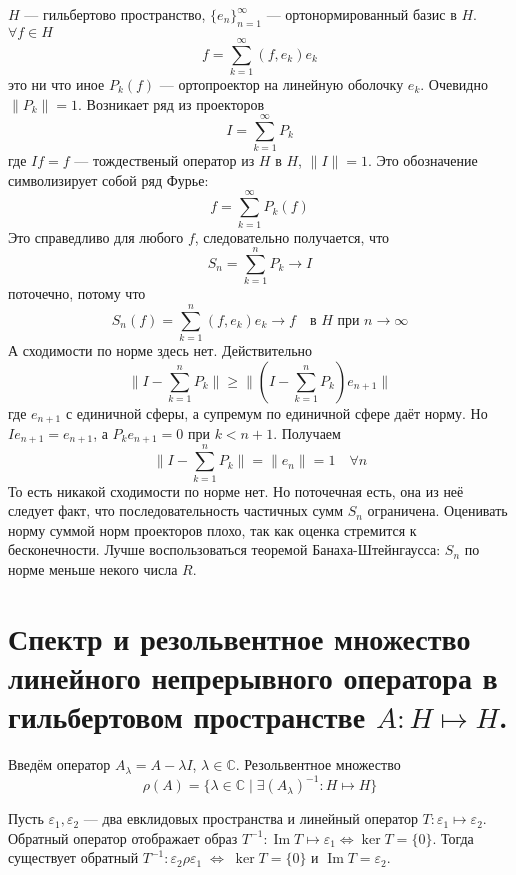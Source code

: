 \documentclass[12pt]{article}
\renewcommand{\Im}{\operatorname{Im}}
\begin{document}
\begin{Prim}
    $H$ --- гильбертово пространство, $\{e_n\}_{n = 1}^{\infty}$ --- ортонормированный базис в $H$.
    $\forall f \in H$
    $$
     f = \sum\limits_{k = 1}^{\infty}(f, e_k)e_k
    $$ 
    это ни что иное $P_k(f)$ --- ортопроектор на линейную оболочку $e_k$.
    Очевидно $\|P_k\| = 1$.
    Возникает ряд из проекторов 
    $$
    I = \sum\limits_{k = 1}^{\infty}P_k
    $$
    где $If = f$ --- тождественый оператор из $H$ в $H$, $\|I\| = 1$.
    Это обозначение символизирует собой ряд Фурье:
    $$
    f = \sum\limits_{k = 1}^{\infty}P_k(f)
    $$
    Это справедливо для любого $f$, следовательно получается, что 
    $$
    S_n = \sum\limits_{k = 1}^{n}P_k \to I
    $$ поточечно, потому что
    $$
    S_n(f) = \sum\limits_{k = 1}^{n}(f, e_k)e_k \to f \quad \text{в }H \text{ при } n \to \infty
    $$
    А сходимости по норме здесь нет.
    Действительно 
    $$
    \|I - \sum\limits_{k = 1}^{n}P_k\| \ge \|(I - \sum\limits_{k = 1}^{n}P_k)e_{n + 1}\|
    $$
    где $e_{n+  1}$ с единичной сферы, а супремум по единичной сфере даёт норму.
    Но $Ie_{n + 1} = e_{n + 1}$, а $P_k e_{n + 1} = 0$ при $k < n + 1$.
    Получаем 
    $$
    \|I - \sum\limits_{k = 1}^{n}P_k\| = \|e_n\| = 1\quad \forall n
    $$
    То есть никакой сходимости по норме нет.
    Но поточечная есть, она из неё следует факт, что последовательность частичных сумм $S_n$ ограничена.
    Оценивать норму суммой норм проекторов плохо, так как оценка стремится к бесконечности.
    Лучше воспользоваться теоремой Банаха-Штейнгаусса: $S_n$ по норме меньше некого числа $R$.
\end{Prim}

\section*{Спектр и резольвентное множество линейного непрерывного оператора в гильбертовом пространстве $A : H \mapsto H$.}

Введём оператор $A_\lambda = A - \lambda I$, $\lambda \in \mathbb C$.
Резольвентное множество 
$$
\rho(A) = \{\lambda \in \mathbb C \mid \exists (A_\lambda)^{-1} : H \mapsto H\}
$$

\begin{Zam}
    Пусть $\varepsilon_1, \varepsilon_2$ --- два евклидовых пространства и линейный оператор $T : \varepsilon_1 \mapsto \varepsilon_2$.
    Обратный оператор отображает образ $T^{-1} : \Im T \mapsto \varepsilon_1 \Leftrightarrow \ker T = \{0\}$.
    Тогда существует обратный $T^{-1}:\varepsilon_2 \rho \varepsilon_1\; \Leftrightarrow\; \ker T = \{0\}$ и $\Im T = \varepsilon_2$.
\end{Zam}
\end{document}
